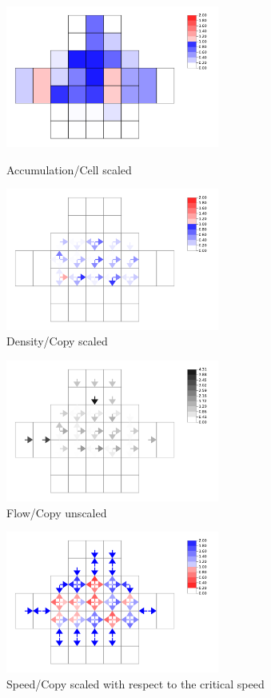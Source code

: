 \documentclass[a4paper,12pt]{article}
\begin{document}
\begin{figure}[h!]
    \centering
    \includegraphics[width=70mm]{figures/accumulation}
    \caption{Accumulation/Cell scaled}
    \includegraphics[width=70mm]{figures/density}
    \caption{Density/Copy scaled}
\end{figure} 
\clearpage
\begin{figure}[h!]
    \centering
    \includegraphics[width=70mm]{figures/flow}
    \caption{Flow/Copy unscaled}
\end{figure} 
\begin{figure}[h!]
    \centering
    \includegraphics[width=70mm]{figures/speed}
    \caption{Speed/Copy scaled with respect to the critical speed}
\end{figure} 
\end{document}
